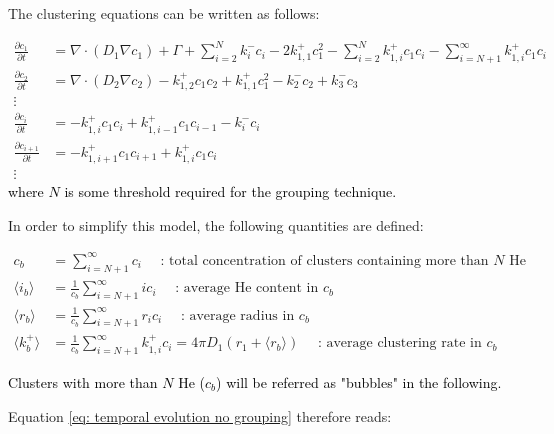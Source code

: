 The clustering equations can be written as follows:

\begin{subequations}
    \begin{align}
        \frac{\partial c_1}{\partial t} &= \nabla \cdot (D_1 \nabla c_1) + \Gamma + \sum\limits_{i=2}^N k_{i}^- c_i - 2k_{1, 1}^+ c_1^2 - \sum\limits_{i=2}^N k_{1,i}^+ c_1 c_i - \sum\limits_{i=N+1}^\infty k_{1,i}^+ c_1 c_i \\
        \frac{\partial c_2}{\partial t} &= \nabla \cdot (D_2 \nabla c_2) - k_{1, 2}^+ c_1 c_2 + k_{1, 1}^+ c_1^2 - k_{2}^- c_2 + k_{3}^- c_3\\
        \vdots \nonumber\\
        \frac{\partial c_i}{\partial t} &= - k_{1, i}^+ c_1 c_i + k_{1, i-1}^+ c_1 c_{i-1} - k_{i}^- c_i\\
        \frac{\partial c_{i+1}}{\partial t} &= - k_{1, i+1}^+ c_1 c_{i+1} + k_{1, i}^+ c_1 c_i\\
        \vdots \nonumber
    \end{align}
    \label{eq: temporal evolution no grouping}
\end{subequations}
\textcolor{black}{where $N$ is some threshold required for the grouping technique.}

In order to simplify this model, the following quantities are defined:

\begin{align}
    c_b &= \sum\limits_{i=N+1}^\infty c_i \quad \text{ : total concentration of clusters containing more than $N$ He} \\
    \langle i_b \rangle &= \frac{1}{c_b} \sum\limits_{i=N+1}^\infty i c_i \quad \text{ : average He content in $c_b$} \\
    \langle r_b \rangle &=  \frac{1}{c_b}\sum\limits_{i=N+1}^\infty r_i c_i \quad \text{ : average radius in $c_b$}\\
    \langle k_b^+ \rangle &=  \frac{1}{c_b}\sum\limits_{i=N+1}^\infty k_{1,i}^+ c_i = 4 \pi D_1 (r_1 + \langle r_b \rangle) \quad \text{ : average clustering rate in $c_b$}
\end{align}

\textcolor{black}{
Clusters with more than $N$ He ($c_b$) will be referred as "bubbles" in the following.
}

Equation \ref{eq: temporal evolution no grouping} therefore reads:

